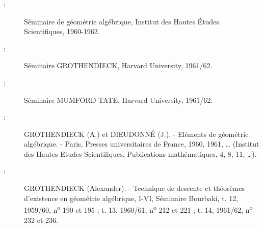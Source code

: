 \begin{description}
\item[{\normalfont{} :}] Séminaire de géométrie algébrique, Institut des Hautes Études
Scientifiques, 1960-1962.

\item[{\normalfont{} :}] Séminaire GROTHENDIECK, Harvard University, 1961/62.

\item[{\normalfont{} :}] Séminaire MUMFORD-TATE, Harvard University, 1961/62.

\item[{\normalfont{} :}] GROTHENDIECK (A.) et DIEUDONNÉ (J.). - Eléments de géométrie
algébrique. - Paris, Presses universitaires de France, 1960, 1961, …
(Institut des Hautes Etudes Scientifiques, Publications mathématiques, 4, 8,
11, …).

\item[{\normalfont{} :}] GROTHENDIECK (Alexander). - Technique de descente et théorèmes
d'existence en géométrie algébrique, I-VI, Séminaire Bourbaki, t. 12,
1959/60, n\textsuperscript{o} 190 et 195 ; t. 13, 1960/61,
n\textsuperscript{o} 212 et 221 ; t. 14, 1961/62, n\textsuperscript{o} 232 et
236.
\end{description}

\par\smallskip
\begingroup\footnotesize
\endgroup
